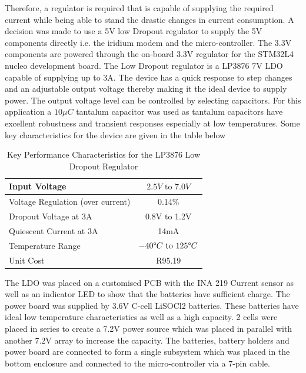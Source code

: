  Therefore, a regulator is required that is capable of supplying the required current  while being able to stand the drastic changes in current consumption. A decision was made to use a 5V low Dropout regulator to supply the 5V components directly i.e. the iridium modem and the micro-controller. The 3.3V components are powered through the on-board 3.3V regulator for the STM32L4 nucleo development board. The Low Dropout regulator is a LP3876 7V LDO capable of supplying up to 3A. The device has a quick response to step changes and an adjustable output voltage thereby making it the ideal device to supply power. The output voltage level can be controlled by selecting capacitors. For this application a $10 \mu C$ tantalum capacitor was used as tantalum capacitors have  excellent robustness and transient responses especially at low temperatures.  Some key characteristics for the device are given in the table below
 
 \begin{table}[H]
     \centering
      \caption{Key Performance Characteristics for the LP3876 Low Dropout Regulator}
     \begin{tabular}{|l|c|}
     \hline
          Input Voltage & $2.5V \text{ to } 7.0V$  \\
          \hline
          Voltage Regulation (over current)& 0.14\%\\
          \hline
          Dropout Voltage at 3A & 0.8V to 1.2V  \\
          \hline
          Quiescent Current at 3A &  14mA\\
          \hline
          Temperature Range & $-40 \degree C \text{ to }125 \degree C$\\
          \hline
          Unit Cost & R95.19 \footnotemark\\
          \hline
     \end{tabular}    
     \label{tab:lp_spec}
 \end{table}
 
 
The LDO was placed on a customised PCB  with the INA 219 Current sensor as well as an indicator LED to show that the batteries have sufficient charge. The power board was supplied by 3.6V C-cell LiSOCl2 batteries. These batteries have ideal low temperature characteristics as well as a high capacity. 2 cells were placed in series to create a 7.2V power source which was placed in parallel with another 7.2V array to increase the capacity. The batteries, battery holders and power board are connected to form a single subsystem which was placed in the bottom enclosure and connected to the micro-controller via a 7-pin cable.

